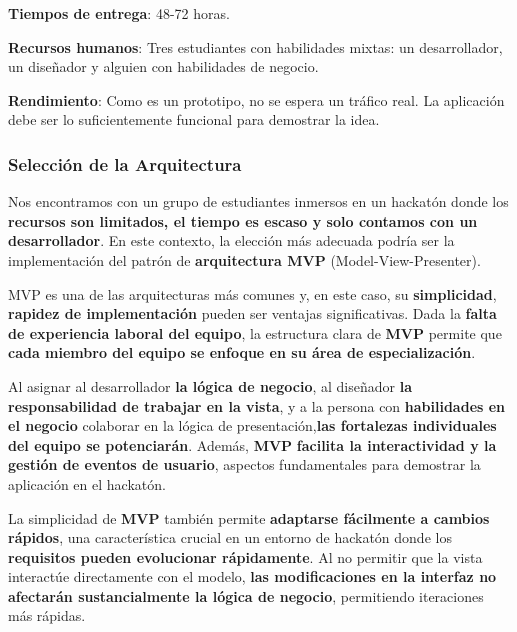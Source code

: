 \documentclass[a4paper]{article}
\begin{document}
    \textbf{Tiempos de entrega}: 48-72 horas.\vspace{0.2cm}
    
    \textbf{Recursos humanos}: Tres estudiantes con habilidades mixtas: un desarrollador, un diseñador y alguien con habilidades de negocio.\vspace{0.2cm}
    
    \textbf{Rendimiento}: Como es un prototipo, no se espera un tráfico real. La aplicación debe ser lo suficientemente funcional para demostrar la idea.\vspace{0.2cm}

    \subsubsection{Selección de la Arquitectura}
    
    Nos encontramos con un grupo de estudiantes inmersos en un hackatón donde los \textbf{recursos son limitados, el tiempo es escaso y solo contamos con un desarrollador}. En este contexto, la elección más adecuada podría ser la implementación del patrón de \textbf{arquitectura MVP} (Model-View-Presenter).\vspace{0.3cm}

    MVP es una de las arquitecturas más comunes y, en este caso, su \textbf{simplicidad}, \textbf{rapidez de implementación} pueden ser ventajas significativas. Dada la \textbf{falta de experiencia laboral del equipo}, la estructura clara de \textbf{MVP} permite que \textbf{cada miembro del equipo se enfoque en su área de especialización}.\vspace{0.3cm}
    
    Al asignar al desarrollador \textbf{la lógica de negocio}, al diseñador \textbf{la responsabilidad de trabajar en la vista}, y a la persona con \textbf{habilidades en el negocio} colaborar en la lógica de presentación,\textbf{las fortalezas individuales del equipo se potenciarán}. Además, \textbf{MVP} \textbf{facilita la interactividad y la gestión de eventos de usuario}, aspectos fundamentales para demostrar la aplicación en el hackatón.\vspace{0.3cm}
    
    La simplicidad de \textbf{MVP} también permite \textbf{adaptarse fácilmente a cambios rápidos}, una característica crucial en un entorno de hackatón donde los \textbf{requisitos pueden evolucionar rápidamente}. Al no permitir que la vista interactúe directamente con el modelo, \textbf{las modificaciones en la interfaz no afectarán sustancialmente la lógica de negocio}, permitiendo iteraciones más rápidas.\vspace{0.3cm}
    
\end{document}
